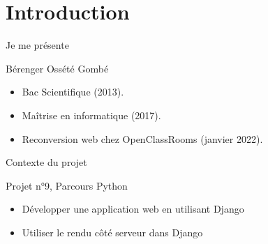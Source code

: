 \section{Introduction}

\begin{frame}{Je me présente}
  \begin{block}{Bérenger Ossété Gombé}
    \begin{itemize}
    \item Bac Scientifique (2013).
    \item Maîtrise en informatique (2017).
    \item Reconversion web chez OpenClassRooms (janvier 2022).
    \end{itemize}
  \end{block}
\end{frame}

\begin{frame}{Contexte du projet}
  \begin{block}{Projet n°9, Parcours Python}
    \begin{itemize}
    \item Développer une application web en utilisant Django
    \item Utiliser le rendu côté serveur dans Django
    \end{itemize}
  \end{block}
\end{frame}

